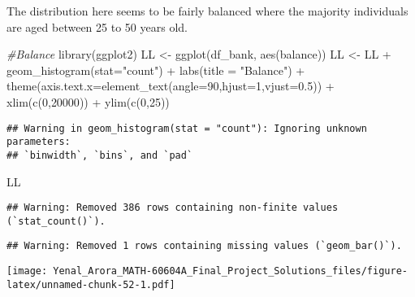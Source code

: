 \documentclass[
]{article}
\newenvironment{Shaded}{\begin{snugshade}}{\end{snugshade}}
\newcommand{\AttributeTok}[1]{\textcolor[rgb]{0.77,0.63,0.00}{#1}}
\newcommand{\CommentTok}[1]{\textcolor[rgb]{0.56,0.35,0.01}{\textit{#1}}}
\newcommand{\DecValTok}[1]{\textcolor[rgb]{0.00,0.00,0.81}{#1}}
\newcommand{\FloatTok}[1]{\textcolor[rgb]{0.00,0.00,0.81}{#1}}
\newcommand{\FunctionTok}[1]{\textcolor[rgb]{0.00,0.00,0.00}{#1}}
\newcommand{\NormalTok}[1]{#1}
\newcommand{\OtherTok}[1]{\textcolor[rgb]{0.56,0.35,0.01}{#1}}
\newcommand{\SpecialCharTok}[1]{\textcolor[rgb]{0.00,0.00,0.00}{#1}}
\newcommand{\StringTok}[1]{\textcolor[rgb]{0.31,0.60,0.02}{#1}}
\begin{document}
The distribution here seems to be fairly balanced where the majority
individuals are aged between 25 to 50 years old.

\begin{Shaded}
\begin{Highlighting}[]
\CommentTok{\#Balance}
\FunctionTok{library}\NormalTok{(ggplot2)}
\NormalTok{LL }\OtherTok{\textless{}{-}} \FunctionTok{ggplot}\NormalTok{(df\_bank, }\FunctionTok{aes}\NormalTok{(balance))}
\NormalTok{LL }\OtherTok{\textless{}{-}}\NormalTok{ LL }\SpecialCharTok{+} \FunctionTok{geom\_histogram}\NormalTok{(}\AttributeTok{stat=}\StringTok{"count"}\NormalTok{) }\SpecialCharTok{+} \FunctionTok{labs}\NormalTok{(}\AttributeTok{title =} \StringTok{"Balance"}\NormalTok{) }\SpecialCharTok{+}
  \FunctionTok{theme}\NormalTok{(}\AttributeTok{axis.text.x=}\FunctionTok{element\_text}\NormalTok{(}\AttributeTok{angle=}\DecValTok{90}\NormalTok{,}\AttributeTok{hjust=}\DecValTok{1}\NormalTok{,}\AttributeTok{vjust=}\FloatTok{0.5}\NormalTok{)) }\SpecialCharTok{+} 
  \FunctionTok{xlim}\NormalTok{(}\FunctionTok{c}\NormalTok{(}\DecValTok{0}\NormalTok{,}\DecValTok{20000}\NormalTok{)) }\SpecialCharTok{+} \FunctionTok{ylim}\NormalTok{(}\FunctionTok{c}\NormalTok{(}\DecValTok{0}\NormalTok{,}\DecValTok{25}\NormalTok{))}
\end{Highlighting}
\end{Shaded}

\begin{verbatim}
## Warning in geom_histogram(stat = "count"): Ignoring unknown parameters:
## `binwidth`, `bins`, and `pad`
\end{verbatim}

\begin{Shaded}
\begin{Highlighting}[]
\NormalTok{LL}
\end{Highlighting}
\end{Shaded}

\begin{verbatim}
## Warning: Removed 386 rows containing non-finite values (`stat_count()`).
\end{verbatim}

\begin{verbatim}
## Warning: Removed 1 rows containing missing values (`geom_bar()`).
\end{verbatim}

\texttt{[image: Yenal\_Arora\_MATH-60604A\_Final\_Project\_Solutions\_files/figure-latex/unnamed-chunk-52-1.pdf]}

\begin{Shaded}
\end{Shaded}
\end{document}
